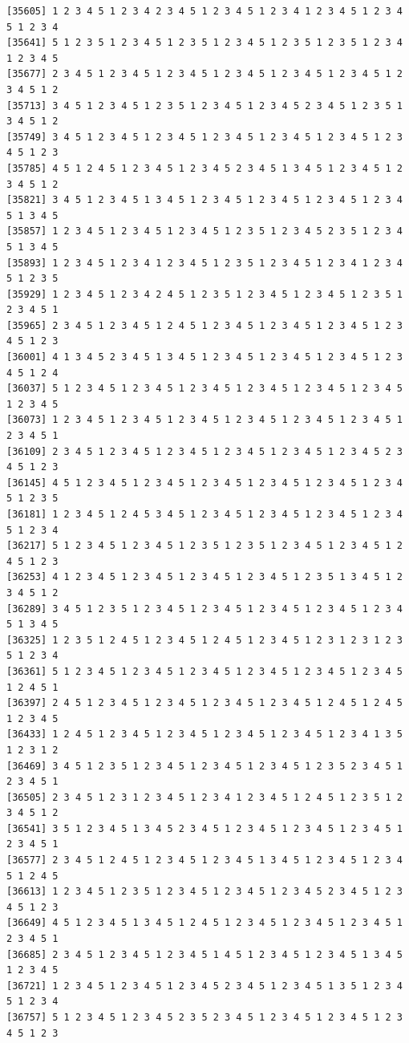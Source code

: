 \documentclass[
  english,
]{book}
\begin{document}
\begin{verbatim}
[35605] 1 2 3 4 5 1 2 3 4 2 3 4 5 1 2 3 4 5 1 2 3 4 1 2 3 4 5 1 2 3 4 5 1 2 3 4
[35641] 5 1 2 3 5 1 2 3 4 5 1 2 3 5 1 2 3 4 5 1 2 3 5 1 2 3 5 1 2 3 4 1 2 3 4 5
[35677] 2 3 4 5 1 2 3 4 5 1 2 3 4 5 1 2 3 4 5 1 2 3 4 5 1 2 3 4 5 1 2 3 4 5 1 2
[35713] 3 4 5 1 2 3 4 5 1 2 3 5 1 2 3 4 5 1 2 3 4 5 2 3 4 5 1 2 3 5 1 3 4 5 1 2
[35749] 3 4 5 1 2 3 4 5 1 2 3 4 5 1 2 3 4 5 1 2 3 4 5 1 2 3 4 5 1 2 3 4 5 1 2 3
[35785] 4 5 1 2 4 5 1 2 3 4 5 1 2 3 4 5 2 3 4 5 1 3 4 5 1 2 3 4 5 1 2 3 4 5 1 2
[35821] 3 4 5 1 2 3 4 5 1 3 4 5 1 2 3 4 5 1 2 3 4 5 1 2 3 4 5 1 2 3 4 5 1 3 4 5
[35857] 1 2 3 4 5 1 2 3 4 5 1 2 3 4 5 1 2 3 5 1 2 3 4 5 2 3 5 1 2 3 4 5 1 3 4 5
[35893] 1 2 3 4 5 1 2 3 4 1 2 3 4 5 1 2 3 5 1 2 3 4 5 1 2 3 4 1 2 3 4 5 1 2 3 5
[35929] 1 2 3 4 5 1 2 3 4 2 4 5 1 2 3 5 1 2 3 4 5 1 2 3 4 5 1 2 3 5 1 2 3 4 5 1
[35965] 2 3 4 5 1 2 3 4 5 1 2 4 5 1 2 3 4 5 1 2 3 4 5 1 2 3 4 5 1 2 3 4 5 1 2 3
[36001] 4 1 3 4 5 2 3 4 5 1 3 4 5 1 2 3 4 5 1 2 3 4 5 1 2 3 4 5 1 2 3 4 5 1 2 4
[36037] 5 1 2 3 4 5 1 2 3 4 5 1 2 3 4 5 1 2 3 4 5 1 2 3 4 5 1 2 3 4 5 1 2 3 4 5
[36073] 1 2 3 4 5 1 2 3 4 5 1 2 3 4 5 1 2 3 4 5 1 2 3 4 5 1 2 3 4 5 1 2 3 4 5 1
[36109] 2 3 4 5 1 2 3 4 5 1 2 3 4 5 1 2 3 4 5 1 2 3 4 5 1 2 3 4 5 2 3 4 5 1 2 3
[36145] 4 5 1 2 3 4 5 1 2 3 4 5 1 2 3 4 5 1 2 3 4 5 1 2 3 4 5 1 2 3 4 5 1 2 3 5
[36181] 1 2 3 4 5 1 2 4 5 3 4 5 1 2 3 4 5 1 2 3 4 5 1 2 3 4 5 1 2 3 4 5 1 2 3 4
[36217] 5 1 2 3 4 5 1 2 3 4 5 1 2 3 5 1 2 3 5 1 2 3 4 5 1 2 3 4 5 1 2 4 5 1 2 3
[36253] 4 1 2 3 4 5 1 2 3 4 5 1 2 3 4 5 1 2 3 4 5 1 2 3 5 1 3 4 5 1 2 3 4 5 1 2
[36289] 3 4 5 1 2 3 5 1 2 3 4 5 1 2 3 4 5 1 2 3 4 5 1 2 3 4 5 1 2 3 4 5 1 3 4 5
[36325] 1 2 3 5 1 2 4 5 1 2 3 4 5 1 2 4 5 1 2 3 4 5 1 2 3 1 2 3 1 2 3 5 1 2 3 4
[36361] 5 1 2 3 4 5 1 2 3 4 5 1 2 3 4 5 1 2 3 4 5 1 2 3 4 5 1 2 3 4 5 1 2 4 5 1
[36397] 2 4 5 1 2 3 4 5 1 2 3 4 5 1 2 3 4 5 1 2 3 4 5 1 2 4 5 1 2 4 5 1 2 3 4 5
[36433] 1 2 4 5 1 2 3 4 5 1 2 3 4 5 1 2 3 4 5 1 2 3 4 5 1 2 3 4 1 3 5 1 2 3 1 2
[36469] 3 4 5 1 2 3 5 1 2 3 4 5 1 2 3 4 5 1 2 3 4 5 1 2 3 5 2 3 4 5 1 2 3 4 5 1
[36505] 2 3 4 5 1 2 3 1 2 3 4 5 1 2 3 4 1 2 3 4 5 1 2 4 5 1 2 3 5 1 2 3 4 5 1 2
[36541] 3 5 1 2 3 4 5 1 3 4 5 2 3 4 5 1 2 3 4 5 1 2 3 4 5 1 2 3 4 5 1 2 3 4 5 1
[36577] 2 3 4 5 1 2 4 5 1 2 3 4 5 1 2 3 4 5 1 3 4 5 1 2 3 4 5 1 2 3 4 5 1 2 4 5
[36613] 1 2 3 4 5 1 2 3 5 1 2 3 4 5 1 2 3 4 5 1 2 3 4 5 2 3 4 5 1 2 3 4 5 1 2 3
[36649] 4 5 1 2 3 4 5 1 3 4 5 1 2 4 5 1 2 3 4 5 1 2 3 4 5 1 2 3 4 5 1 2 3 4 5 1
[36685] 2 3 4 5 1 2 3 4 5 1 2 3 4 5 1 4 5 1 2 3 4 5 1 2 3 4 5 1 3 4 5 1 2 3 4 5
[36721] 1 2 3 4 5 1 2 3 4 5 1 2 3 4 5 2 3 4 5 1 2 3 4 5 1 3 5 1 2 3 4 5 1 2 3 4
[36757] 5 1 2 3 4 5 1 2 3 4 5 2 3 5 2 3 4 5 1 2 3 4 5 1 2 3 4 5 1 2 3 4 5 1 2 3

\end{verbatim}
\end{document}
